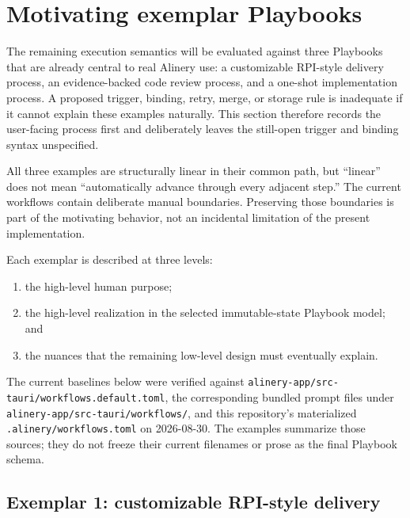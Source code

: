 \documentclass[11pt]{article}
\begin{document}
\clearpage
\section{Motivating exemplar Playbooks}

\begin{summarybox}
The remaining execution semantics will be evaluated against three Playbooks that are already central to real Alinery use: a customizable RPI-style delivery process, an evidence-backed code review process, and a one-shot implementation process. A proposed trigger, binding, retry, merge, or storage rule is inadequate if it cannot explain these examples naturally. This section therefore records the user-facing process first and deliberately leaves the still-open trigger and binding syntax unspecified.
\end{summarybox}

All three examples are structurally linear in their common path, but ``linear'' does not mean ``automatically advance through every adjacent step.'' The current workflows contain deliberate manual boundaries. Preserving those boundaries is part of the motivating behavior, not an incidental limitation of the present implementation.

Each exemplar is described at three levels:

\begin{enumerate}
  \item the high-level human purpose;
  \item the high-level realization in the selected immutable-state Playbook model; and
  \item the nuances that the remaining low-level design must eventually explain.
\end{enumerate}

The current baselines below were verified against \texttt{alinery-app/src-tauri/workflows.default.toml}, the corresponding bundled prompt files under \texttt{alinery-app/src-tauri/workflows/}, and this repository's materialized \texttt{.alinery/workflows.toml} on 2026-08-30. The examples summarize those sources; they do not freeze their current filenames or prose as the final Playbook schema.

\subsection{Exemplar 1: customizable RPI-style delivery}
\end{document}
